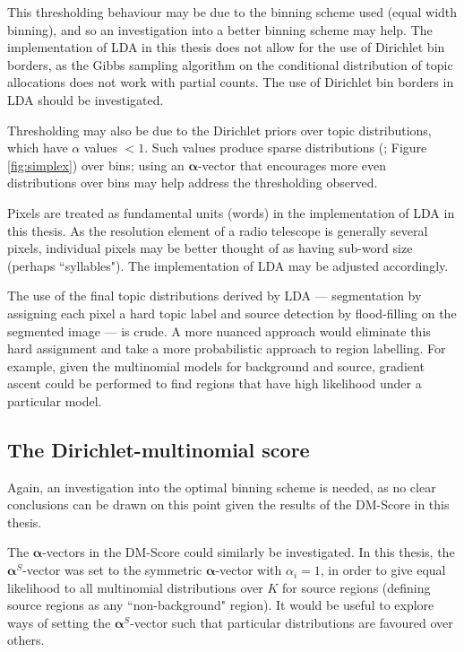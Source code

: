 This thresholding behaviour may be due to the binning scheme used (equal width binning), and so an investigation into a better binning scheme may help. The implementation of LDA in this thesis does not allow for the use of Dirichlet bin borders, as the Gibbs sampling algorithm on the conditional distribution of topic allocations does not work with partial counts. The use of Dirichlet bin borders in LDA should be investigated.

Thresholding may also be due to the Dirichlet priors over topic distributions, which have $\alpha$ values $<1$. Such values produce sparse distributions (\cite{frigyik2010introduction}; Figure \ref{fig:simplex}) over bins; using an $\boldsymbol{\alpha}$-vector that encourages more even distributions over bins may help address the thresholding observed. 

Pixels are treated as fundamental units (words) in the implementation of LDA in this thesis. As the resolution element of a radio telescope is generally several pixels, individual pixels may be better thought of as having sub-word size (perhaps ``syllables"). The implementation of LDA may be adjusted accordingly.

The use of the final topic distributions derived by LDA --- segmentation by assigning each pixel a hard topic label and source detection by flood-filling on the segmented image --- is crude. A more nuanced approach would eliminate this hard assignment and take a more probabilistic approach to region labelling. For example, given the multinomial models for background and source, gradient ascent could be performed to find regions that have high likelihood under a particular model.

\subsection{The Dirichlet-multinomial score}

Again, an investigation into the optimal binning scheme is needed, as no clear conclusions can be drawn on this point given the results of the DM-Score in this thesis. 

The $\boldsymbol{\alpha}$-vectors in the DM-Score could similarly be investigated. In this thesis, the $\boldsymbol{\alpha}^S$-vector was set to the symmetric $\boldsymbol{\alpha}$-vector with $\alpha_i = 1$, in order to give equal likelihood to all multinomial distributions over $K$ for source regions (defining source regions as any ``non-background" region). It would be useful to explore ways of setting the $\boldsymbol{\alpha}^S$-vector such that particular distributions are favoured over others. 

